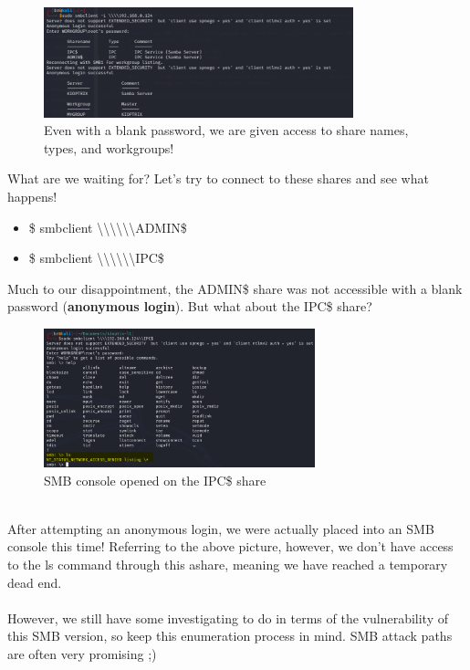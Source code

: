 \documentclass[a4paper,11pt]{article}
\renewcommand{\tt}[2][tt]{\textcolor{#1}{\ttfamily #2}}%
\begin{document}
\begin{figure}[h]
    \centering
    \includegraphics[width=0.8\textwidth]{images/smbclient_k.png}
    \caption{Even with a blank password, we are given access to share names, types, and workgroups!}
    \label{fig:smbclient_k}
\end{figure}
\pagebreak

What are we waiting for? Let's try to connect to these shares and see what happens!
\begin{itemize}
    \item \tt{\$ smbclient \textbackslash \textbackslash \textbackslash \textbackslash <target IP>\textbackslash \textbackslash ADMIN\$}
    \item \tt{\$ smbclient \textbackslash \textbackslash \textbackslash \textbackslash <target IP>\textbackslash \textbackslash IPC\$}
\end{itemize}
Much to our disappointment, the \tt{ADMIN\$} share was not accessible with a blank password ({\bfseries anonymous login}). But what about the \tt{IPC\$} share?
\\
\begin{figure}[h]
    \centering
    \includegraphics[width=0.7\textwidth]{images/smblsfail.png}
    \caption{SMB console opened on the \tt{IPC\$} share}
    \label{fig:smblsfail}
\end{figure}
\\
After attempting an anonymous login, we were actually placed into an SMB console this time! Referring to the above picture, however, we don't have access to the \tt{ls} command through this ashare, meaning we have reached a temporary dead end.
\\
\\
However, we still have some investigating to do in terms of the vulnerability of this SMB version, so keep this enumeration process in mind. SMB attack paths are often very promising ;)
\end{document}
